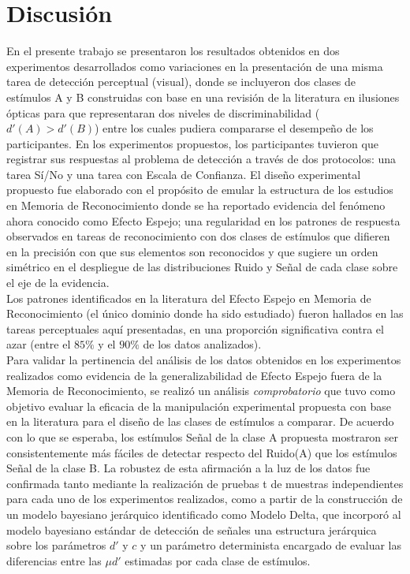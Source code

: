 
\chapter{Discusión} %

\label{Cap_Disc} %

En el presente trabajo se presentaron los resultados obtenidos en dos experimentos desarrollados como variaciones en la presentación de una misma tarea de detección perceptual (visual), donde se incluyeron dos clases de estímulos A y B construidas con base en una revisión de la literatura en ilusiones ópticas para que representaran dos niveles de discriminabilidad ($d'(A)>d'(B)$) entre los cuales pudiera compararse el desempeño de los participantes. En los experimentos propuestos, los participantes tuvieron que registrar sus respuestas al problema de detección a través de dos protocolos: una tarea Sí/No y una tarea con Escala de Confianza. El diseño experimental propuesto fue elaborado con el propósito de emular la estructura de los estudios en Memoria de Reconocimiento donde se ha reportado evidencia del fenómeno ahora conocido como Efecto Espejo; una regularidad en los patrones de respuesta observados en tareas de reconocimiento con dos clases de estímulos que difieren en la precisión con que sus elementos son reconocidos y que sugiere un orden simétrico en el despliegue de las distribuciones Ruido y Señal de cada clase sobre el eje de la evidencia.\\

Los patrones identificados en la literatura del Efecto Espejo en Memoria de Reconocimiento (el único dominio donde ha sido estudiado) fueron hallados en las tareas perceptuales aquí presentadas, en una proporción significativa contra el azar (entre el $85\%$ y el $90\%$ de los datos analizados).\\

Para validar la pertinencia del análisis de los datos obtenidos en los experimentos realizados como evidencia de la generalizabilidad de Efecto Espejo fuera de la Memoria de Reconocimiento, se realizó un análisis \textit{comprobatorio} que tuvo como objetivo evaluar la eficacia de la manipulación experimental propuesta con base en la literatura para el diseño de las clases de estímulos a comparar. De acuerdo con lo que se esperaba, los estímulos Señal de la clase A propuesta mostraron ser consistentemente más fáciles de detectar respecto del Ruido(A) que los estímulos Señal de la clase B. La robustez de esta afirmación a la luz de los datos fue confirmada tanto mediante la realización de pruebas t de muestras independientes para cada uno de los experimentos realizados, como a partir de la construcción de un modelo bayesiano jerárquico identificado como Modelo Delta, que incorporó al modelo bayesiano estándar de detección de señales una estructura jerárquica sobre los parámetros $d'$ y $c$ y un parámetro determinista encargado de evaluar las diferencias entre las $\mu d'$ estimadas por cada clase de estímulos.\\

